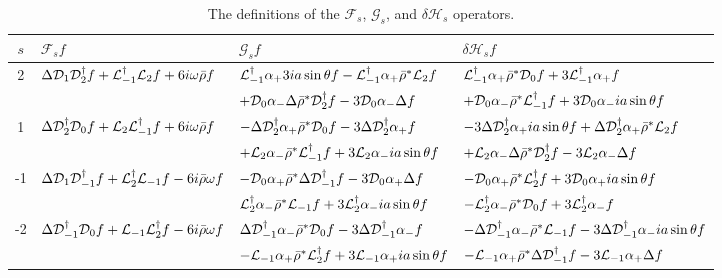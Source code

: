 \begin{refsection}
\begin{table}[h]
\begin{center}
    \begin{tabular}{ | c | p{1.5in} | p{1.5in} |  p{1.5in}|}
    \hline
    $s$ & $\mathcal{F}_s f$ & $\mathcal{G}_s f$ & $\delta\mathcal{H}_s f$ \\ \hline
  2 & $ \Delta \mathcal{D}_1\mathcal{D}_2^\dagger f +\mathcal{L}_{-1}^\dagger\mathcal{L}_2 f+6i\omega\bar\rho f$
 & $\mathcal{L}_{-1}^\dagger \alpha_+3ia\sin\theta f-\mathcal{L}_{-1}^\dagger \alpha_+\bar{\rho}^*\mathcal{L}_2 f$ & $\mathcal{L}_{-1}^\dagger\alpha_+\bar{\rho}^*\mathcal{D}_0f+3\mathcal{L}_{-1}^\dagger\alpha_+f $\\ & &$+\mathcal{D}_0\alpha_-\Delta\bar{\rho}^*\mathcal{D}_2^\dagger f-3\mathcal{D}_0\alpha_- \Delta f$ & $+\mathcal{D}_0\alpha_-\bar{\rho}^*\mathcal{L}_{-1}^\dagger f+3\mathcal{D}_0\alpha_-ia\sin\theta f$  \\ \hline
    1 & $ \Delta \mathcal{D}_2^\dagger\mathcal{D}_0 f +\mathcal{L}_{2}\mathcal{L}_{-1}^\dagger f+6i\omega\bar\rho f$ & $-\Delta\mathcal{D}_2^\dagger\alpha_+\bar{\rho}^*\mathcal{D}_0f-3\Delta\mathcal{D}_2^\dagger\alpha_+f$ & $-3\Delta\mathcal{D}_2^\dagger\alpha_+ia\sin\theta f+\Delta\mathcal{D}_2^\dagger\alpha_+\bar{\rho}^*\mathcal{L}_2f$ \\ & &$+\mathcal{L}_2\alpha_-\bar{\rho}^*\mathcal{L}_{-1}^\dagger f+3\mathcal{L}_2\alpha_-ia\sin\theta f$ & $+\mathcal{L}_2\alpha_-\Delta\bar{\rho}^*\mathcal{D}_2^\dagger f-3\mathcal{L}_2\alpha_-\Delta f $\\ \hline
    -1 & $\Delta\mathcal{D}_1\mathcal{D}_{-1}^\dagger f+\mathcal{L}_2^\dagger\mathcal{L}_{-1}f-6i\bar{\rho}\omega f$ & $- \mathcal{D}_0 \alpha_+ \bar{\rho}^* \Delta \mathcal{D}_{-1}^\dagger f -3 \mathcal{D}_0 \alpha_+ \Delta f$ & $-\mathcal{D}_0 \alpha_+ \bar{\rho}^* \mathcal{L}_2^\dagger f +3 \mathcal{D}_0 \alpha_+ ia \sin \theta f$ \\ & &$\mathcal{L}_2^\dagger \alpha_- \bar{\rho}^* \mathcal{L}_{-1} f +3 \mathcal{L}_2^\dagger \alpha_- i a\sin\theta f$ &$-\mathcal{L}_2^\dagger \alpha_- \bar{\rho}^* \mathcal{D}_0 f +3 \mathcal{L}_2^\dagger \alpha _- f$ \\ \hline
    -2 & $\Delta\mathcal{D}_{-1}^\dagger\mathcal{D}_0 f+\mathcal{L}_{-1}\mathcal{L}_2^\dagger f-6i\bar{\rho}\omega f$& $\Delta \mathcal{D}_{-1}^\dagger \alpha_-\bar{\rho}^*\mathcal{D}_0 f -3\Delta \mathcal{D}_{-1}^\dagger \alpha_- f$ & $-\Delta \mathcal{D}_{-1}^\dagger \alpha_- \bar{\rho}^* \mathcal{L}_{-1} f -3 \Delta \mathcal{D}_{-1}^\dagger \alpha_- i a \sin \theta f$ \\ &  &$- \mathcal{L}_{-1}\alpha_+ \bar{\rho}^* \mathcal{L}_2 ^\dagger f +3 \mathcal{L}_{-1} \alpha_+ i a \sin \theta f$ & $-\mathcal{L}_{-1} \alpha_+ \bar{\rho}^* \Delta \mathcal{D}_{-1}^\dagger f -3\mathcal{L}_{-1} \alpha_+ \Delta f$ \\ \hline
    \end{tabular} 
\end{center} 
\caption{The definitions of the $\mathcal{F}_s$, $\mathcal{G}_s$, and $\delta \mathcal{H}_s$ operators.}
\label{table}
\end{table}





\printbibliography[heading=subbibliography]
\end{refsection}